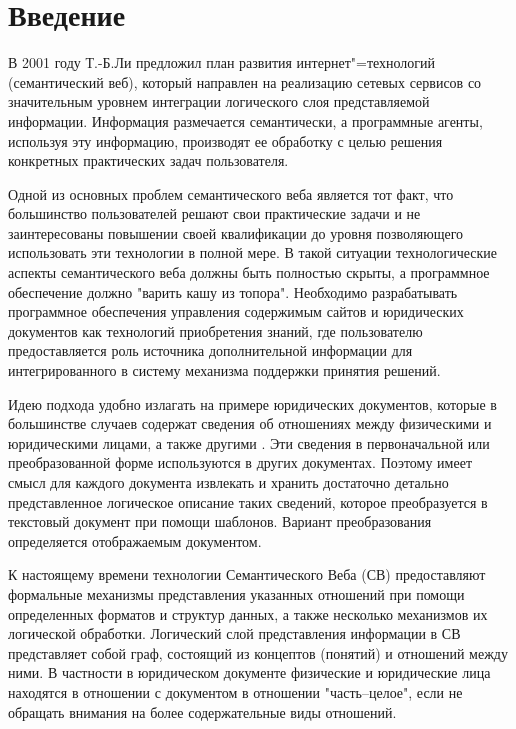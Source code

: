 \documentclass[conference]{IEEEtran}
\begin{document}




%
\IEEEpeerreviewmaketitle



\section*{Введение}

В 2001 году Т.-Б.Ли предложил план развития интернет"=технологий (семантический веб), который направлен на реализацию сетевых сервисов со значительным уровнем интеграции логического слоя представляемой информации. Информация размечается семантически, а программные агенты, используя эту информацию, производят ее обработку с целью решения конкретных практических задач пользователя.

Одной из основных проблем семантического веба является тот факт, что большинство пользователей решают свои практические задачи и не заинтересованы повышении своей квалификации до уровня позволяющего использовать эти технологии в полной мере. В такой ситуации технологические аспекты семантического веба должны быть полностью скрыты, а программное обеспечение должно "варить кашу из топора". Необходимо разрабатывать программное обеспечения управления содержимым сайтов и юридических документов как технологий приобретения знаний, где пользователю предоставляется роль источника дополнительной информации для интегрированного в систему механизма поддержки принятия решений.

Идею подхода удобно излагать на примере юридических документов, которые в большинстве случаев содержат сведения об отношениях между физическими и юридическими лицами, а также другими . Эти сведения в первоначальной или преобразованной форме используются в других документах. Поэтому имеет смысл для каждого документа извлекать и хранить достаточно детально представленное логическое описание таких сведений, которое преобразуется в текстовый документ при помощи шаблонов. Вариант преобразования определяется отображаемым документом.

К настоящему времени технологии Семантического Веба (СВ) предоставляют формальные механизмы представления указанных отношений при помощи определенных форматов и структур данных, а также несколько механизмов их логической обработки. Логический слой представления информации в СВ представляет собой граф, состоящий из концептов (понятий) и отношений между ними. В частности в юридическом документе физические и юридические лица находятся в отношении с документом в отношении "часть--целое", если не обращать внимания на более содержательные виды отношений.
\end{document}
